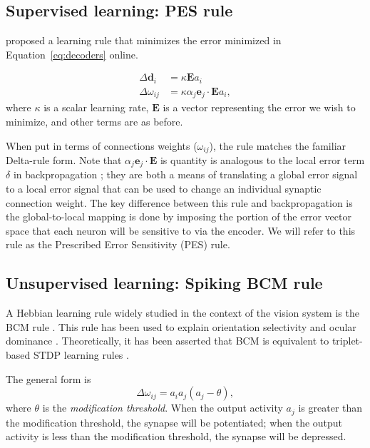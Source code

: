\documentclass[10pt,letterpaper]{article}
\begin{document}
\subsection{Supervised learning: PES rule}

 proposed a learning rule
that minimizes the error minimized
in Equation~\eqref{eq:decoders} online.

\begin{align} \label{eq:pes}
  \Delta \mathbf{d}_i &= \kappa \mathbf{E} a_i \nonumber \\
  \Delta \omega_{ij} &= \kappa \alpha_j \mathbf{e}_j \cdot \mathbf{E} a_i,
\end{align}
where $\kappa$ is a scalar learning rate,
$\mathbf{E}$ is a vector representing the error we wish to minimize,
and other terms are as before.

When put in terms of connections weights ($\omega_{ij}$),
the rule matches the familiar Delta-rule form.
Note that $\alpha_j \mathbf{e}_j \cdot \mathbf{E}$
is quantity is analogous to the local error term
$\delta$ in backpropagation \cite{Rumelhart1986};
they are both a means of translating a global error signal
to a local error signal that can be used to
change an individual synaptic connection weight.
The key difference between this rule
and backpropagation is the global-to-local mapping
is done by imposing the portion of the error vector space
that each neuron will be sensitive to via the encoder.
We will refer to this rule as
the Prescribed Error Sensitivity (PES) rule.

\subsection{Unsupervised learning: Spiking BCM rule}

A Hebbian learning rule widely studied
in the context of the vision system
is the BCM rule \cite{Bienenstock1982}.
This rule has been used to explain orientation selectivity
and ocular dominance \cite{Bienenstock1982}.
Theoretically, it has been asserted that BCM is equivalent
to triplet-based STDP learning rules \cite{Pfister2006}.

The general form is
\begin{equation} \label{eq:orig-bcm}
  \Delta \omega_{ij} = a_i a_j (a_j - \theta),
\end{equation}
where $\theta$ is the \textit{modification threshold}.
When the output activity $a_j$ is
greater than the modification threshold,
the synapse will be potentiated;
when the output activity is less than the modification threshold,
the synapse will be depressed.
\end{document}
